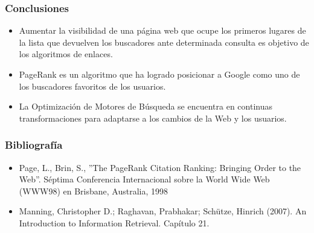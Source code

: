 \documentclass[
10pt, %
aspectratio=169, %
]{beamer}
\begin{document}
	\begin{frame}
		
		\frametitle{Conclusiones}
		
		\begin{itemize}
			
			\item Aumentar la visibilidad de una página web que ocupe los primeros lugares de la lista que devuelven los buscadores ante determinada consulta es objetivo de los algoritmos de enlaces. \\[2mm]
			
			\item PageRank es un algoritmo que ha logrado posicionar a Google como uno de los buscadores favoritos de los usuarios. \\[2mm]
			
			\item La Optimización de Motores de Búsqueda se encuentra en continuas transformaciones para adaptarse a los cambios de la Web y los usuarios.
			
		\end{itemize}
		
	\end{frame}

	\begin{frame}
		
		\frametitle{Bibliografía}
		
		\begin{itemize}
						
			\item Page, L., Brin, S., ”The PageRank Citation Ranking: Bringing Order to the Web”. Séptima Conferencia Internacional sobre la World Wide Web (WWW98) en Brisbane, Australia, 1998
			
			\item Manning, Christopher D.;  Raghavan, Prabhakar; Schütze, Hinrich (2007). An Introduction to Information Retrieval. Capítulo 21.
			
		\end{itemize}
		
	\end{frame}
	
	\begin{frame}
		\titlepage
	\end{frame}
	
	
	
\end{document}
